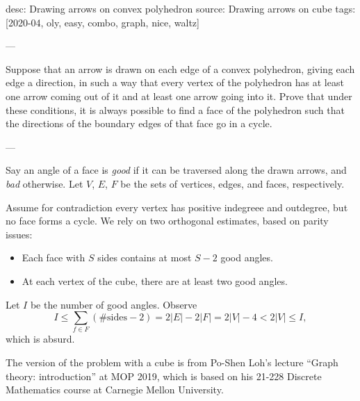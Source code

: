 desc: Drawing arrows on convex polyhedron
source: Drawing arrows on cube
tags: [2020-04, oly, easy, combo, graph, nice, waltz]

---

Suppose that an arrow is drawn on each edge of a convex polyhedron, giving each edge a direction, in such a way that every vertex of the polyhedron has at least one arrow coming out of it and at least one arrow going into it. Prove that under these conditions, it is always possible to find a face of the polyhedron such that the directions of the boundary edges of that face go in a cycle.

---

Say an angle of a face is \emph{good} if it can be traversed along the drawn arrows, and \emph{bad} otherwise. Let $V$, $E$, $F$ be the sets of vertices, edges, and faces, respectively.

Assume for contradiction every vertex has positive indegreee and outdegree, but no face forms a cycle. We rely on two orthogonal estimates, based on parity issues:
\begin{itemize}[itemsep=0em]
    \item Each face with $S$ sides contains at most $S-2$ good angles.
    \item At each vertex of the cube, there are at least two good angles.
\end{itemize}
Let $I$ be the number of good angles. Observe \[I\le\sum_{f\in F}(\text{\# sides}-2)=2|E|-2|F|=2|V|-4<2|V|\le I,\]
which is absurd.
\begin{remark}
    The version of the problem with a cube is from Po-Shen Loh's lecture ``Graph theory: introduction'' at MOP 2019, which is based on his 21-228 Discrete Mathematics course at Carnegie Mellon University.
\end{remark}
